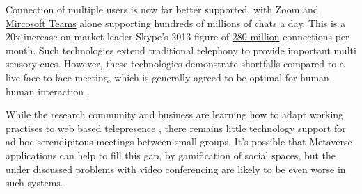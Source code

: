Connection of multiple users is now far better supported, with Zoom and \href{https://www.microsoft.com/en-us/Investor/earnings/FY-2021-Q1/press-release-webcast}{Mircosoft Teams} alone supporting hundreds of millions of chats a day. This is a 20x increase on market leader Skype's 2013 figure of \href{https://www.microsoft.com/en-us/Investor/earnings/FY-2013-Q1/press-release-webcast}{280 million} connections per month. Such technologies extend traditional telephony to provide important multi sensory cues.  However, these technologies demonstrate shortfalls compared to a live face-to-face meeting, which is generally agreed to be optimal for human-human interaction \cite{Wolff2008}.\par
While the research community and business are learning how to adapt working practises to web based telepresence \cite{oeppen2020human}, there remains little technology support for ad-hoc serendipitous meetings between small groups. It's possible that Metaverse applications can help to fill this gap, by gamification of social spaces, but the under discussed problems with video conferencing are likely to be even worse in such systems. \par

